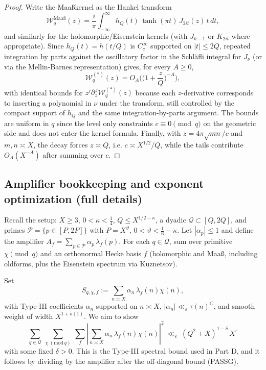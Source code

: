 \documentclass[11pt]{article}
\theoremstyle{definition}
\theoremstyle{remark}
\numberwithin{equation}{part}
\begin{document}
\begin{proof}
	Write the Maa\ss kernel as the Hankel transform
	\[
		\mathcal W_q^{\mathrm{Maa\text{\ss}}}(z) = \frac{i}{\pi}\int_{-\infty}^{\infty} h_Q(t)\,\tanh(\pi t)\,J_{2it}(z)\,t\,dt,
	\]
	and similarly for the holomorphic/Eisenstein kernels (with $J_{k-1}$ or $K_{2it}$ where appropriate). Since $h_Q(t)=h(t/Q)$ is $C_c^\infty$ supported on $|t|\le 2Q$, repeated integration by parts against the oscillatory factor in the Schl\"afli integral for $J_\nu$ (or via the Mellin-Barnes representation) gives, for every $A\ge 0$,
	\[
		\mathcal W_q^{(*)}(z)=O_A\!\Big(\Big(1+\frac{z}{Q}\Big)^{-A}\Big),
	\]
	with identical bounds for $z^j\partial_z^{\,j}\mathcal W_q^{(*)}(z)$ because each $z$-derivative corresponds to inserting a polynomial in $\nu$ under the transform, still controlled by the compact support of $h_Q$ and the same integration-by-parts argument. The bounds are uniform in $q$ since the level only constraints $c\equiv 0\pmod q$ on the geometric side and does not enter the kernel formula.
	Finally, with $z=4\pi\sqrt{mn}/c$ and $m,n\asymp X$, the decay forces $z\asymp Q$, i.e. $c\asymp X^{1/2}/Q$, while the tails contribute $O_A(X^{-A})$ after summing over $c$.
\end{proof}

\subsection{Amplifier bookkeeping and exponent optimization (full details)}

Recall the setup: $X\ge 3$, $0<\kappa<\tfrac14$, $Q\le X^{1/2-\kappa}$, a dyadic $\mathcal Q\subset[Q,2Q]$,
and primes $\mathcal P=\{p\in[P,2P]\}$ with $P=X^\vartheta$, $0<\vartheta<\tfrac16-\kappa$.
Let $|\alpha_p|\le 1$ and define the amplifier $A_f=\sum_{p\in\mathcal P}\alpha_p\,\lambda_f(p)$.
For each $q\in\mathcal Q$, sum over primitive $\chi\pmod q$ and an orthonormal Hecke basis $f$
(holomorphic and Maaß, including oldforms, plus the Eisenstein spectrum via Kuznetsov).

Set
\[
	S_{q,\chi,f}:=\sum_{n\asymp X}\alpha_n\,\lambda_f(n)\chi(n),
\]
with Type-III coefficients $\alpha_n$ supported on $n\asymp X$,
$|\alpha_n|\ll_\varepsilon \tau(n)^C$, and smooth weight of width $X^{1+o(1)}$.
We aim to show
\begin{equation}\label{eq:TypeIIIgoal}
	\sum_{q\in\mathcal Q}\ \sum_{\chi\ (\mathrm{mod}\ q)}\ \sum_f
	\left|\sum_{n\asymp X}\alpha_n\,\lambda_f(n)\chi(n)\right|^2
	\ \ll_\varepsilon\ (Q^2+X)^{1-\delta}\,X^{\varepsilon}
\end{equation}
with some fixed $\delta>0$. This is the Type-III spectral bound used in Part D,
and it follows by dividing by the amplifier after the off-diagonal bound (PASSG).
\end{document}

